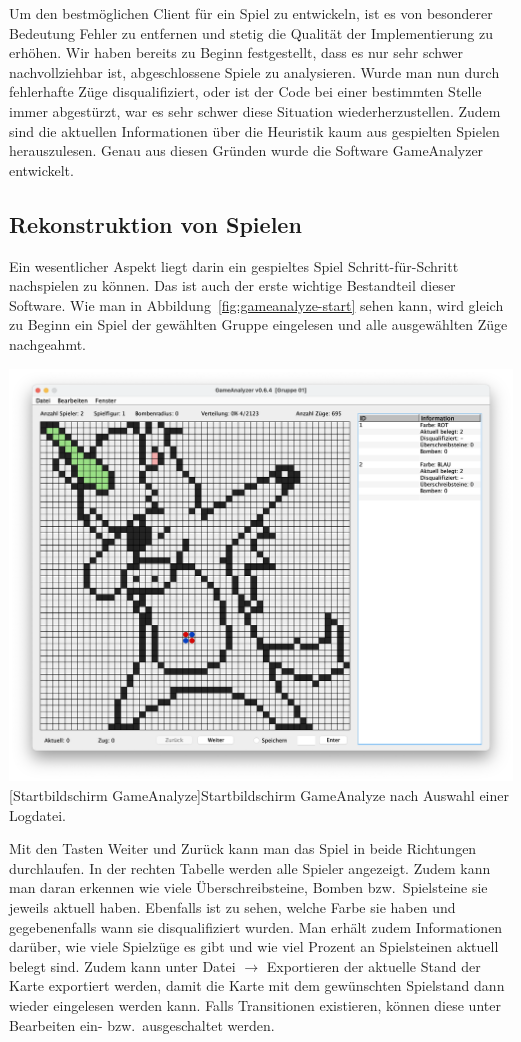 Um den bestm\"oglichen Client f\"ur ein Spiel zu entwickeln, ist es von besonderer Bedeutung Fehler zu entfernen und stetig die Qualit\"at der Implementierung zu erh\"ohen.
Wir haben bereits zu Beginn festgestellt, dass es nur sehr schwer nachvollziehbar ist, abgeschlossene Spiele zu analysieren.
Wurde man nun durch fehlerhafte Z\"uge disqualifiziert, oder ist der Code bei einer bestimmten Stelle immer abgest\"urzt, war es sehr schwer diese Situation wiederherzustellen.
Zudem sind die aktuellen Informationen \"uber die Heuristik kaum aus gespielten Spielen herauszulesen.
Genau aus diesen Gr\"unden wurde die Software GameAnalyzer entwickelt.

\subsection{Rekonstruktion von Spielen}\label{subsec:rekonstruktion-von-spielen}
Ein wesentlicher Aspekt liegt darin ein gespieltes Spiel Schritt-f\"ur-Schritt nachspielen zu k\"onnen.
Das ist auch der erste wichtige Bestandteil dieser Software.
Wie man in Abbildung~\ref{fig:gameanalyze-start} sehen kann, wird gleich zu Beginn ein Spiel der gew\"ahlten Gruppe eingelesen und alle ausgew\"ahlten Z\"uge nachgeahmt.

\vspace{1em}
\begin{minipage}{\linewidth}
    \centering
    \includegraphics[width=0.7\linewidth]{pics/startscreen}
    [Startbildschirm GameAnalyze]{Startbildschirm GameAnalyze nach Auswahl einer Logdatei.}
    \label{fig:gameanalyze-start}
\end{minipage}

Mit den Tasten Weiter und Zur\"uck kann man das Spiel in beide Richtungen durchlaufen.
In der rechten Tabelle werden alle Spieler angezeigt.
Zudem kann man daran erkennen wie viele \"Uberschreibsteine, Bomben bzw.\ Spielsteine sie jeweils aktuell haben.
Ebenfalls ist zu sehen, welche Farbe sie haben und gegebenenfalls wann sie disqualifiziert wurden.
Man erh\"alt zudem Informationen dar\"uber, wie viele Spielz\"uge es gibt und wie viel Prozent an Spielsteinen aktuell belegt sind.
Zudem kann unter Datei $\rightarrow$ Exportieren der aktuelle Stand der Karte exportiert werden, damit die Karte mit dem gew\"unschten Spielstand dann wieder eingelesen werden kann.
Falls Transitionen existieren, k\"onnen diese unter Bearbeiten ein- bzw.\ ausgeschaltet werden.

